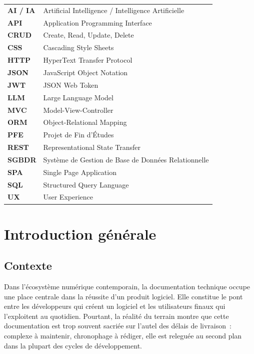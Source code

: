 \documentclass[12pt, a4paper, twoside, openany]{report}
\begin{document}
\begin{tabular}{lp{12cm}}
\textbf{AI / IA}  & Artificial Intelligence / Intelligence Artificielle \\
\textbf{API}      & Application Programming Interface \\
\textbf{CRUD}     & Create, Read, Update, Delete \\
\textbf{CSS}      & Cascading Style Sheets \\
\textbf{HTTP}     & HyperText Transfer Protocol \\
\textbf{JSON}     & JavaScript Object Notation \\
\textbf{JWT}      & JSON Web Token \\
\textbf{LLM}      & Large Language Model \\
\textbf{MVC}      & Model-View-Controller \\
\textbf{ORM}      & Object-Relational Mapping \\
\textbf{PFE}      & Projet de Fin d'\'Etudes \\
\textbf{REST}     & Representational State Transfer \\
\textbf{SGBDR}    & Syst\`eme de Gestion de Base de Donn\'ees Relationnelle \\
\textbf{SPA}      & Single Page Application \\
\textbf{SQL}      & Structured Query Language \\
\textbf{UX}       & User Experience \\
\end{tabular}

\clearpage
{}
\chapter*{Introduction g\'en\'erale}

\section*{Contexte}

Dans l'\'ecosyst\`eme num\'erique contemporain, la documentation technique occupe
une place centrale dans la r\'eussite d'un produit logiciel. Elle constitue le pont
entre les d\'eveloppeurs qui cr\'eent un logiciel et les utilisateurs finaux qui
l'exploitent au quotidien. Pourtant, la r\'ealit\'e du terrain montre que cette
documentation est trop souvent sacri\'ee sur l'autel des d\'elais de livraison~:
complexe \`a maintenir, chronophage \`a r\'ediger, elle est relegu\'ee au second plan
dans la plupart des cycles de d\'eveloppement.
\end{document}
